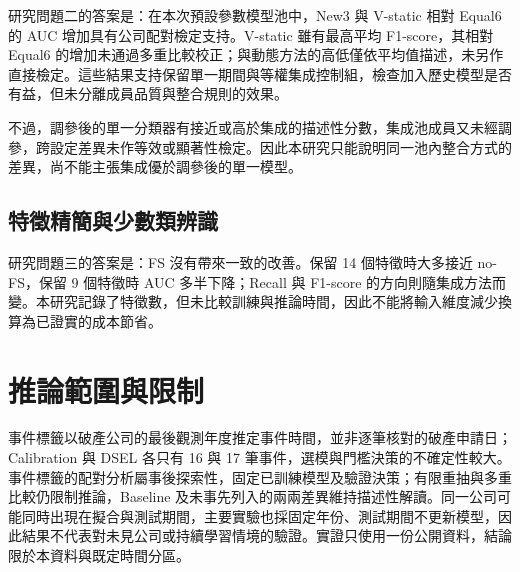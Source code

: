 研究問題二的答案是：在本次預設參數模型池中，New3 與 V-static 相對 Equal6 的 AUC 增加具有公司配對檢定支持。V-static 雖有最高平均 F1-score，其相對 Equal6 的增加未通過多重比較校正；與動態方法的高低僅依平均值描述，未另作直接檢定。這些結果支持保留單一期間與等權集成控制組，檢查加入歷史模型是否有益，但未分離成員品質與整合規則的效果。

不過，調參後的單一分類器有接近或高於集成的描述性分數，集成池成員又未經調參，跨設定差異未作等效或顯著性檢定。因此本研究只能說明同一池內整合方式的差異，尚不能主張集成優於調參後的單一模型。

\subsection{特徵精簡與少數類辨識}

研究問題三的答案是：FS 沒有帶來一致的改善。保留 14 個特徵時大多接近 no-FS，保留 9 個特徵時 AUC 多半下降；Recall 與 F1-score 的方向則隨集成方法而變。本研究記錄了特徵數，但未比較訓練與推論時間，因此不能將輸入維度減少換算為已證實的成本節省。

\section{推論範圍與限制}

事件標籤以破產公司的最後觀測年度推定事件時間，並非逐筆核對的破產申請日；Calibration 與 DSEL 各只有 16 與 17 筆事件，選模與門檻決策的不確定性較大。事件標籤的配對分析屬事後探索性，固定已訓練模型及驗證決策；有限重抽與多重比較仍限制推論，Baseline 及未事先列入的兩兩差異維持描述性解讀。同一公司可能同時出現在擬合與測試期間，主要實驗也採固定年份、測試期間不更新模型，因此結果不代表對未見公司或持續學習情境的驗證。實證只使用一份公開資料，結論限於本資料與既定時間分區。
\endgroup
